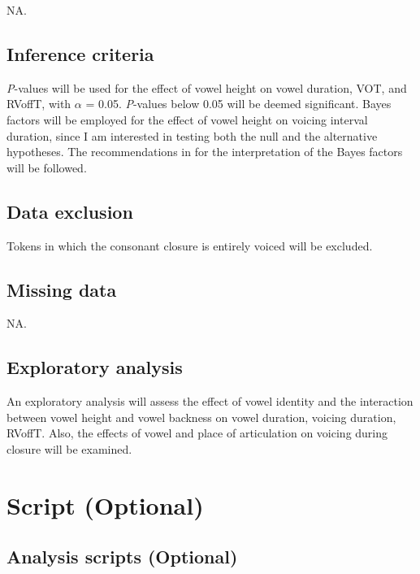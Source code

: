 \documentclass[11pt,]{article}
\begin{document}
NA.

\hypertarget{inference-criteria}{%
\subsection{Inference criteria}\label{inference-criteria}}

\emph{P}-values will be used for the effect of vowel height on vowel
duration, VOT, and RVoffT, with \(\alpha\) = 0.05. \emph{P}-values below
0.05 will be deemed significant. Bayes factors will be employed for the
effect of vowel height on voicing interval duration, since I am
interested in testing both the null and the alternative hypotheses. The
recommendations in \citet[139]{raftery1995} for the interpretation of
the Bayes factors will be followed.

\hypertarget{data-exclusion}{%
\subsection{Data exclusion}\label{data-exclusion}}

Tokens in which the consonant closure is entirely voiced will be
excluded.

\hypertarget{missing-data}{%
\subsection{Missing data}\label{missing-data}}

NA.

\hypertarget{exploratory-analysis}{%
\subsection{Exploratory analysis}\label{exploratory-analysis}}

An exploratory analysis will assess the effect of vowel identity and the
interaction between vowel height and vowel backness on vowel duration,
voicing duration, RVoffT. Also, the effects of vowel and place of
articulation on voicing during closure will be examined.

\hypertarget{script-optional}{%
\section{Script (Optional)}\label{script-optional}}

\hypertarget{analysis-scripts-optional}{%
\subsection{Analysis scripts
(Optional)}\label{analysis-scripts-optional}}
\end{document}
